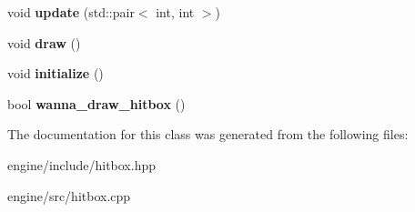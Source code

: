 \begin{DoxyCompactItemize}
\item 
void {\bfseries update} (std\+::pair$<$ int, int $>$)\hypertarget{classengine_1_1_hitbox_a039214e70d6043ddde6c130a92fd858f}{}\label{classengine_1_1_hitbox_a039214e70d6043ddde6c130a92fd858f}

\item 
void {\bfseries draw} ()\hypertarget{classengine_1_1_hitbox_aa4b7afca0a7eb745b9a52d23538c5436}{}\label{classengine_1_1_hitbox_aa4b7afca0a7eb745b9a52d23538c5436}

\item 
void {\bfseries initialize} ()\hypertarget{classengine_1_1_hitbox_afb153b598e3b99372a86229373da4e13}{}\label{classengine_1_1_hitbox_afb153b598e3b99372a86229373da4e13}

\item 
bool {\bfseries wanna\+\_\+draw\+\_\+hitbox} ()\hypertarget{classengine_1_1_hitbox_a97553f82c37ed4270d507cc352180fb2}{}\label{classengine_1_1_hitbox_a97553f82c37ed4270d507cc352180fb2}

\end{DoxyCompactItemize}


The documentation for this class was generated from the following files\+:\begin{DoxyCompactItemize}
\item 
engine/include/hitbox.\+hpp\item 
engine/src/hitbox.\+cpp\end{DoxyCompactItemize}
